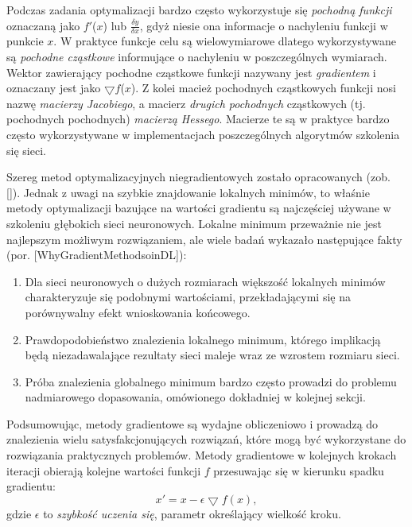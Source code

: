Podczas zadania optymalizacji bardzo często wykorzystuje się \textit{pochodną funkcji} oznaczaną jako $f'$($x$) lub $\frac{\delta y}{\delta x}$, gdyż niesie ona informacje o nachyleniu funkcji w punkcie $x$. W praktyce funkcje celu są wielowymiarowe dlatego wykorzystywane są \textit{pochodne cząstkowe} informujące o nachyleniu w poszczególnych wymiarach. Wektor zawierający pochodne cząstkowe funkcji nazywany jest \textit{gradientem} i oznaczany jest jako $\bigtriangledown f$($x$). Z kolei macież pochodnych cząstkowych funkcji nosi nazwę \textit{macierzy Jacobiego}, a macierz \textit{drugich pochodnych} cząstkowych (tj. pochodnych pochodnych) \textit{macierzą Hessego}. Macierze te są w praktyce bardzo często wykorzystywane w implementacjach poszczególnych algorytmów szkolenia się sieci.

Szereg metod optymalizacyjnych niegradientowych zostało opracowanych (zob. []). Jednak z uwagi na szybkie znajdowanie lokalnych minimów, to właśnie metody optymalizacji bazujące na wartości gradientu są najczęściej używane w szkoleniu głębokich sieci neuronowych. Lokalne minimum przeważnie nie jest najlepszym możliwym rozwiązaniem, ale wiele badań wykazało następujące fakty (por. [WhyGradientMethodsoinDL]):
\begin{enumerate}
	\item Dla sieci neuronowych o dużych rozmiarach większość lokalnych minimów charakteryzuje się podobnymi wartościami, przekładającymi się na porównywalny efekt wnioskowania końcowego.
	\item Prawdopodobieństwo znalezienia lokalnego minimum, którego implikacją będą niezadawalające rezultaty sieci maleje wraz ze wzrostem rozmiaru sieci.
	\item Próba znalezienia globalnego minimum bardzo często prowadzi do problemu nadmiarowego dopasowania, omówionego dokładniej w kolejnej sekcji.
\end{enumerate}

Podsumowując, metody gradientowe są wydajne obliczeniowo i prowadzą do znalezienia wielu satysfakcjonujących rozwiązań, które mogą być wykorzystane do rozwiązania praktycznych problemów. Metody gradientowe w kolejnych krokach iteracji obierają kolejne wartości funkcji $f$ przesuwając się w kierunku spadku gradientu:
\begin{equation}
x' = x - \epsilon \bigtriangledown f(x),
\end{equation} 
gdzie $\epsilon$ to \textit{szybkość uczenia się}, parametr określający wielkość kroku. 

